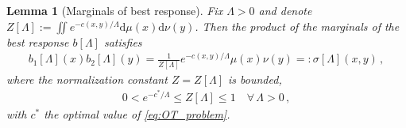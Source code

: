 \documentclass[11pt,a4paper,final]{article}
\newcommand{\KL}[2]{\text{KL}(#1\,|\,#2)}
\def\P{\mathcal P}
\def\R{\mathbb R}
\renewcommand{\d}{\mathrm{d}}
\newcommand{\norm}[1]{\left\lVert#1\right\rVert}
\newcommand{\1}{\mathbf{1}}
\theoremstyle{plain}
\newtheorem{lemma}[theorem]{Lemma}
\numberwithin{equation}{section}
\numberwithin{theorem}{section}
\begin{document}
\begin{lemma}[Marginals of best response]\label{lem:best-response-marginals}
Fix $\Lambda>0$ and denote $Z[\Lambda]:= \iint e^{-c(x,y)/\Lambda}\d\mu(x)\d\nu(y)$. Then the product of the marginals of the best response $b[\Lambda]$ satisfies
\begin{align}\label{eq:EL}
    b_1[\Lambda](x)b_2[\Lambda](y)
    =\frac{1}{Z[\Lambda]}e^{-c(x,y)/\Lambda}\mu(x)\nu(y)=:\sigma[\Lambda](x,y)\,,
\end{align}
where the normalization constant $Z=Z[\Lambda]$ is bounded,
\begin{align}\label{eq:Z}
    0<e^{-c^*/\Lambda} \le Z[\Lambda]\le 1 \quad \forall \,\Lambda>0\,,
\end{align}
with $c^*$ the optimal value of \eqref{eq:OT_problem}.
\end{lemma}
\end{document}
